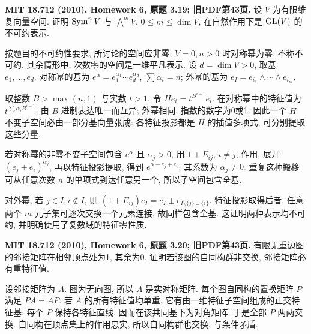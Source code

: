 \begin{exercise}\label{hw:3.19}
\textbf{MIT 18.712 (2010), Homework 6, 原题 3.19; 旧PDF第43页.}
设 $V$ 为有限维复向量空间. 证明 $\operatorname{Sym}^nV$ 与 $\bigwedge^mV$, $0\le m\le\dim V$, 在自然作用下是 $\operatorname{GL}(V)$ 的不可约表示.
\end{exercise}
\begin{solution}
按题目的不可约性要求, 所讨论的空间应非零; $V=0,n>0$ 时对称幂为零, 不称不可约. 其余情形中, 次数零的空间是一维平凡表示. 设 $d=\dim V>0$, 取基 $e_1,\ldots,e_d$. 对称幂的基为 $e^\alpha=e_1^{\alpha_1}\cdots e_d^{\alpha_d}$, $\sum\alpha_i=n$; 外幂的基为 $e_I=e_{i_1}\wedge\cdots\wedge e_{i_m}$.

取整数 $B>\max(n,1)$ 与实数 $t>1$, 令 $H e_i=t^{B^{i-1}}e_i$. 在对称幂中的特征值为 $t^{\sum\alpha_iB^{i-1}}$, 由 $B$ 进制表达唯一而互异; 外幂相同, 指数的数字为0或1. 因此一个 $H$ 不变子空间必由一部分基向量张成: 各特征投影都是 $H$ 的插值多项式, 可分别提取这些分量.

若对称幂的非零不变子空间包含 $e^\alpha$ 且 $\alpha_j>0$, 用 $1+E_{ij}$, $i\ne j$, 作用, 展开 $(e_j+e_i)^{\alpha_j}$, 再以特征投影提取, 得到 $e^{\alpha-e_j+e_i}$; 其系数为 $\alpha_j\ne0$. 重复这种搬移可从任意次数 $n$ 的单项式到达任意另一个, 所以子空间包含全基.

对外幂, 若 $j\in I,i\notin I$, 则 $(1+E_{ij})e_I=e_I\pm e_{I\setminus\{j\}\cup\{i\}}$. 特征投影取得后者. 任意两个 $m$ 元子集可逐次交换一个元素连接, 故同样包含全基. 这证明两种表示均不可约, 并明确使用了复数域的特征零性质.
\end{solution}

\begin{exercise}\label{hw:3.20}
\textbf{MIT 18.712 (2010), Homework 6, 原题 3.20; 旧PDF第43页.}
有限无重边图的邻接矩阵在相邻顶点处为1, 其余为0. 证明若该图的自同构群非交换, 邻接矩阵必有重特征值.
\end{exercise}
\begin{solution}
设邻接矩阵为 $A$. 图为无向图, 所以 $A$ 是实对称矩阵. 每个图自同构的置换矩阵 $P$ 满足 $PA=AP$. 若 $A$ 的所有特征值均单重, 它有由一维特征子空间组成的正交特征基; 每个 $P$ 保持各特征直线, 因而在该共同基下为对角矩阵. 于是全部 $P$ 两两交换. 自同构在顶点集上的作用忠实, 所以自同构群也交换, 与条件矛盾.
\end{solution}


